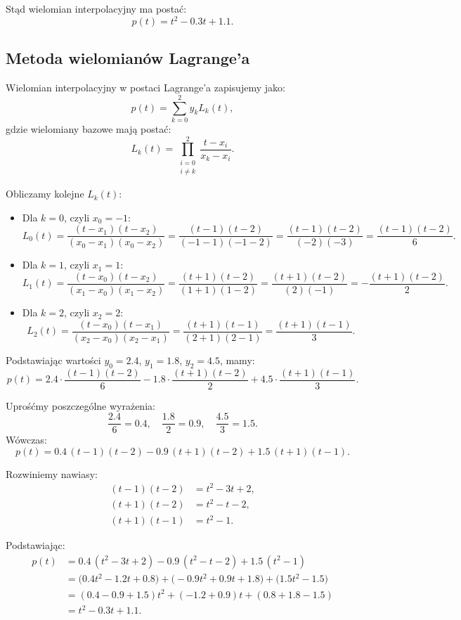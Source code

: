 \documentclass{article}
\begin{document}
Stąd wielomian interpolacyjny ma postać:
\begin{equation} \tag{6}
p(t)=t^2-0.3t+1.1.
\end{equation}

\subsection{Metoda wielomianów Lagrange’a}
Wielomian interpolacyjny w postaci Lagrange’a zapisujemy jako:
\[
p(t)=\sum_{k=0}^{2}y_k L_k(t),
\]
gdzie wielomiany bazowe mają postać:
\[
L_k(t)=\prod_{\substack{i=0 \\ i\neq k}}^{2}\frac{t-x_i}{x_k-x_i}.
\]

Obliczamy kolejne $L_k(t)$:
\begin{itemize}
    \item Dla $k=0$, czyli $x_0=-1$:
    \[
    L_0(t)=\frac{(t-x_1)(t-x_2)}{(x_0-x_1)(x_0-x_2)}=\frac{(t-1)(t-2)}{(-1-1)(-1-2)}=\frac{(t-1)(t-2)}{(-2)(-3)}=\frac{(t-1)(t-2)}{6}.
    \]
    \item Dla $k=1$, czyli $x_1=1$:
    \[
    L_1(t)=\frac{(t-x_0)(t-x_2)}{(x_1-x_0)(x_1-x_2)}=\frac{(t+1)(t-2)}{(1+1)(1-2)}=\frac{(t+1)(t-2)}{(2)(-1)}=-\frac{(t+1)(t-2)}{2}.
    \]
    \item Dla $k=2$, czyli $x_2=2$:
    \[
    L_2(t)=\frac{(t-x_0)(t-x_1)}{(x_2-x_0)(x_2-x_1)}=\frac{(t+1)(t-1)}{(2+1)(2-1)}=\frac{(t+1)(t-1)}{3}.
    \]
\end{itemize}

Podstawiając wartości $y_0=2.4$, $y_1=1.8$, $y_2=4.5$, mamy:
\[
p(t)=2.4\cdot\frac{(t-1)(t-2)}{6} -1.8\cdot\frac{(t+1)(t-2)}{2} + 4.5\cdot\frac{(t+1)(t-1)}{3}.
\]

Uprośćmy poszczególne wyrażenia:
\[
\frac{2.4}{6}=0.4,\quad \frac{1.8}{2}=0.9,\quad \frac{4.5}{3}=1.5.
\]
Wówczas:
\[
p(t)=0.4\,(t-1)(t-2) - 0.9\,(t+1)(t-2) + 1.5\,(t+1)(t-1).
\]

Rozwiniemy nawiasy:
\begin{align*}
(t-1)(t-2)&=t^2-3t+2,\\[1mm]
(t+1)(t-2)&=t^2-t-2,\\[1mm]
(t+1)(t-1)&=t^2-1.
\end{align*}

Podstawiając:
\begin{align*}
p(t) &= 0.4\,(t^2-3t+2) - 0.9\,(t^2-t-2) + 1.5\,(t^2-1)\\[1mm]
&= \bigl(0.4t^2-1.2t+0.8\bigr) + \bigl(-0.9t^2+0.9t+1.8\bigr) + \bigl(1.5t^2-1.5\bigr)\\[1mm]
&= (0.4-0.9+1.5)t^2 + (-1.2+0.9)t + (0.8+1.8-1.5)\\[1mm]
&= t^2 - 0.3t + 1.1.
\end{align*}
\end{document}
